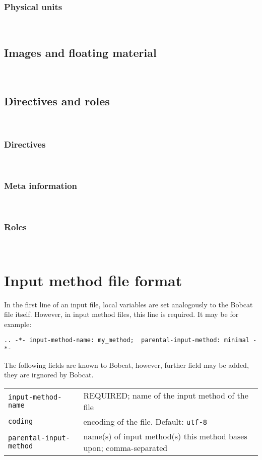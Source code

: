 \documentclass[12pt,openany]{book}
\begin{document}
~


\subsubsection{Physical units}

~

\subsection{Images and floating material}


~

\subsection{Directives and roles}

~

\subsubsection{Directives}

~

\subsubsection{Meta information}

~

\subsubsection{Roles}

~


\section{Input method file format}

In the first line of an input file, local variables are set analogously to the
Bobcat file itself.  However, in input method files, this line is required.  It
may be for example:

\begin{lstlisting}
.. -*- input-method-name: my_method;  parental-input-method: minimal -*-
\end{lstlisting}

The following fields are known to Bobcat, however, further field may be added,
they are irgnored by Bobcat.

\begin{center}
\begin{tabular}{@{}lp{7cm}@{}}
  \toprule
  \verb|input-method-name| & REQUIRED; name of the input method of the file \\
  \verb|coding| & encoding of the file.  Default: \verb|utf-8|\\
  \verb|parental-input-method| & name(s) of input method(s) this method bases
  upon; comma-separated\\
  \bottomrule
\end{tabular}
\end{center}
\end{document}
